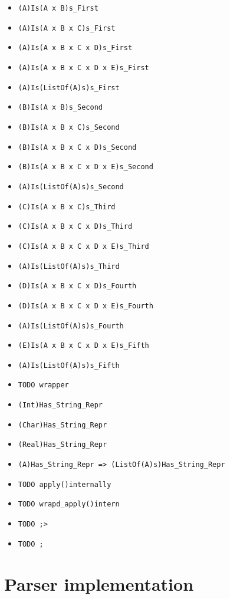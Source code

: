 \documentclass{article}
\begin{document}
\begin{itemize}
  \begin{itemize}
  \item \texttt{(A)Is(A x B)s_First}
  \item \texttt{(A)Is(A x B x C)s_First}
  \item \texttt{(A)Is(A x B x C x D)s_First}
  \item \texttt{(A)Is(A x B x C x D x E)s_First}
  \item \texttt{(A)Is(ListOf(A)s)s_First}
  \item \texttt{(B)Is(A x B)s_Second}
  \item \texttt{(B)Is(A x B x C)s_Second}
  \item \texttt{(B)Is(A x B x C x D)s_Second}
  \item \texttt{(B)Is(A x B x C x D x E)s_Second}
  \item \texttt{(A)Is(ListOf(A)s)s_Second}
  \item \texttt{(C)Is(A x B x C)s_Third}
  \item \texttt{(C)Is(A x B x C x D)s_Third}
  \item \texttt{(C)Is(A x B x C x D x E)s_Third}
  \item \texttt{(A)Is(ListOf(A)s)s_Third}
  \item \texttt{(D)Is(A x B x C x D)s_Fourth}
  \item \texttt{(D)Is(A x B x C x D x E)s_Fourth}
  \item \texttt{(A)Is(ListOf(A)s)s_Fourth}
  \item \texttt{(E)Is(A x B x C x D x E)s_Fifth}
  \item \texttt{(A)Is(ListOf(A)s)s_Fifth}
  \item \texttt{TODO wrapper}
  \item \texttt{(Int)Has_String_Repr}
  \item \texttt{(Char)Has_String_Repr}
  \item \texttt{(Real)Has_String_Repr}
  \item \texttt{(A)Has_String_Repr => (ListOf(A)s)Has_String_Repr}
  \item \texttt{TODO apply()internally}
  \item \texttt{TODO wrapd_apply()intern}
  \item \texttt{TODO ;>}
  \item \texttt{TODO ;}
  \end{itemize}

\end{itemize}

\section{Parser implementation}
\end{document}
